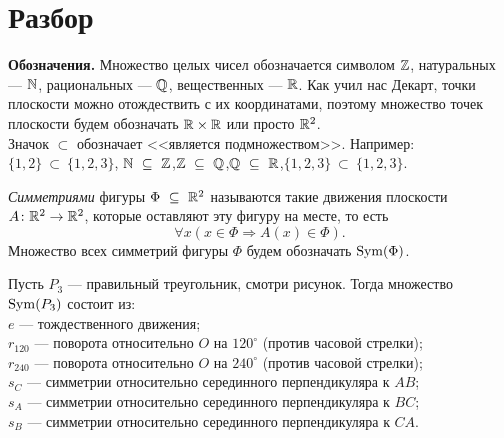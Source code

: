 \documentclass[a4paper,12pt]{article}
\begin{document}
    
    \section{Разбор}
    
    \textbf{Обозначения.} Множество целых чисел обозначается символом $\mathbb{Z}$, натуральных --- $\mathbb{N}$, рациональных --- $\mathbb{Q}$, вещественных --- $\mathbb{R}$. Как учил нас Декарт, точки плоскости можно отождествить с их координатами, поэтому множество точек плоскости будем обозначать $\mathbb{R} \times \mathbb{R}$ или просто $\mathbb{R}^2$. \\
    Значок $\subset$ обозначает <<является подмножеством>>. Например: $\{1,2\}~\subset~\{1,2,3\}$, \quad $\mathbb{N}~\subseteq~\mathbb{Z}$,\quad $\mathbb{Z}~\subseteq~\mathbb{Q}$,\quad $\mathbb{Q}~\subseteq~\mathbb{R}$,\quad $\{1, 2, 3\}~\subset~\{1, 2, 3\}$.
    
     \emph{Симметриями} фигуры $\Phi~\subseteq~\mathbb{R}^2$ называются такие движения плоскости $A \colon \mathbb{R}^2 \to \mathbb{R}^2$, которые оставляют эту фигуру на месте, то есть
    \begin{equation*}
        \forall x (x \in \Phi \Rightarrow A(x) \in \Phi).
    \end{equation*}
    Множество всех симметрий фигуры $\Phi$ будем обозначать $\operatorname{Sym}(\Phi)$.
    
    \begin{wrapfigure}{r}{0.4\linewidth}
        \vspace{-1ex}
    \end{wrapfigure}
    \example Пусть $P_3$ --- правильный треугольник, смотри рисунок. Тогда множество $\operatorname{Sym}(P_3)$ состоит из:\\
    $e$ --- тождественного движения;\\
    $r_{120}$ --- поворота относительно $O$ на $120^\circ$ (против часовой стрелки);\\
    $r_{240}$ --- поворота относительно $O$ на $240^\circ$ (против часовой стрелки);\\
    $s_C$ --- симметрии относительно серединного перпендикуляра к $AB$;\\
    $s_A$ --- симметрии относительно серединного перпендикуляра к $BC$;\\
    $s_B$ --- симметрии относительно серединного перпендикуляра к $CA$.
    
\end{document}
